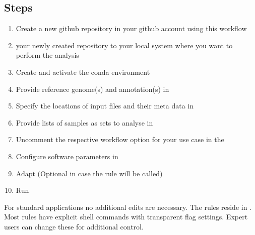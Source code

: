 \documentclass[letterpaper,10pt,english]{sphinxhowto}
\begin{document}
\subsection{Steps}
\label{\detokenize{index:steps}}\begin{enumerate}
%
\item {} 
Create a new github repository in your github account using this workflow 

\item {} 
 your newly created repository to your local system where you want to perform the analysis

\item {} 
Create and activate the conda environment

\item {} 
Provide reference genome(s) and annotation(s) in 

\item {} 
Specify the locations of input files and their meta data in 

\item {} 
Provide lists of samples as sets to analyse in 

\item {} 
Uncomment the respective workflow option for your use case in the 

\item {} 
Configure software parameters in 

\item {} 
Adapt  (Optional in case the  rule will be called)

\item {} 
Run 

\end{enumerate}

For standard applications no additional edits are necessary. The rules reside in . Most rules have explicit shell commands with transparent flag settings. Expert users can change these for additional control.
\end{document}
